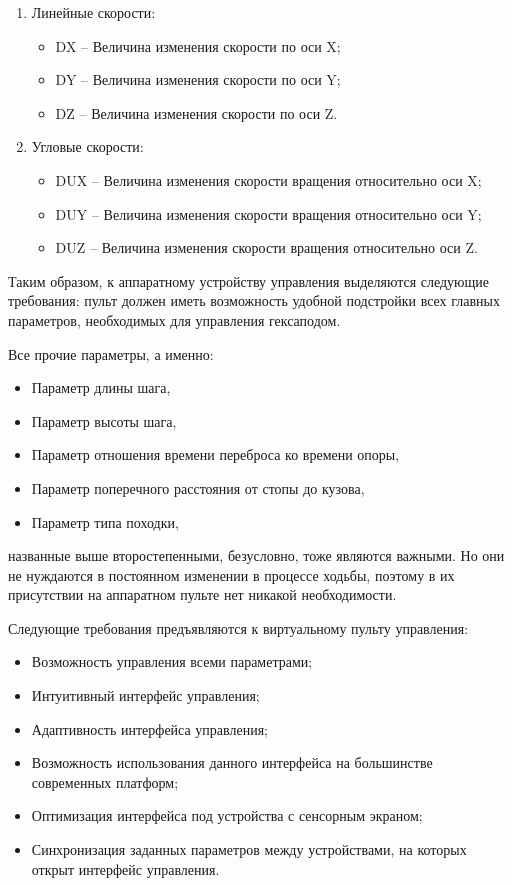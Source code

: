 \begin{enumerate}
	\item Линейные скорости:
		\begin{itemize}
			\item DX – Величина изменения скорости по оси X;
			\item DY – Величина изменения скорости по оси Y;
			\item DZ – Величина изменения скорости по оси Z.
		\end{itemize}
	\item Угловые скорости:
		\begin{itemize}
			\item DUX – Величина изменения скорости вращения относительно оси X;
			\item DUY – Величина изменения скорости вращения относительно оси Y;
			\item DUZ – Величина изменения скорости вращения относительно оси Z.
		\end{itemize}
\end{enumerate}

Таким образом, к аппаратному устройству управления выделяются следующие требования: пульт должен иметь возможность удобной подстройки всех главных параметров, необходимых для управления гексаподом.
	
Все прочие параметры, а именно:

\begin{itemize}
	\item Параметр длины шага,
	\item Параметр высоты шага,
	\item Параметр отношения времени переброса ко времени опоры,
	\item Параметр поперечного расстояния от стопы до кузова,
	\item Параметр типа походки,
\end{itemize}

названные выше второстепенными, безусловно, тоже являются важными. Но они не нуждаются в постоянном изменении в процессе ходьбы, поэтому в их присутствии на аппаратном пульте нет никакой необходимости.

Следующие требования предъявляются к виртуальному пульту управления:

\begin{itemize}
	\item Возможность управления всеми параметрами;
	\item Интуитивный интерфейс управления;
	\item Адаптивность интерфейса управления;
	\item Возможность использования данного интерфейса на большинстве современных платформ;
	\item Оптимизация интерфейса под устройства с сенсорным экраном;
	\item Синхронизация заданных параметров между устройствами, на которых открыт интерфейс управления.
\end{itemize}
	
